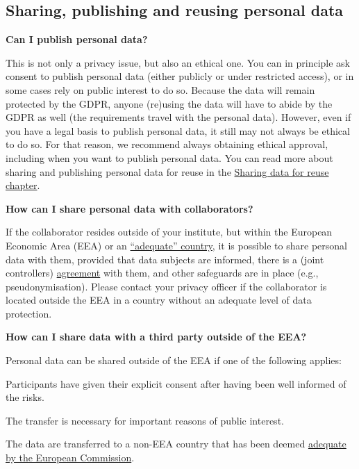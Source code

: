 \documentclass[
]{book}
\begin{document}
\hypertarget{sharing}{%
\subsection{Sharing, publishing and reusing personal data}\label{sharing}}

\textbf{Can I publish personal data?}

This is not only a privacy issue, but also an ethical one. You can in principle ask consent to publish personal data (either publicly or under restricted access), or in some cases rely on public interest to do so. Because the data will remain protected by the GDPR, anyone (re)using the data will have to abide by the GDPR as well (the requirements travel with the personal data). However, even if you have a legal basis to publish personal data, it still may not always be ethical to do so. For that reason, we recommend always obtaining ethical approval, including when you want to publish personal data. You can read more about sharing and publishing personal data for reuse in the \protect\hyperlink{data-sharing-reuse}{Sharing data for reuse chapter}.

\textbf{How can I share personal data with collaborators?}

If the collaborator resides outside of your institute, but within the European Economic Area (EEA) or an \href{https://ec.europa.eu/info/law/law-topic/data-protection/international-dimension-data-protection/adequacy-decisions_en}{``adequate'' country}, it is possible to share personal data with them, provided that data subjects are informed, there is a (joint controllers) \protect\hyperlink{agreements}{agreement} with them, and other safeguards are in place (e.g., pseudonymisation). Please contact your privacy officer if the collaborator is located outside the EEA in a country without an adequate level of data protection.

\textbf{How can I share data with a third party outside of the EEA?}

Personal data can be shared outside of the EEA if one of the following applies:

Participants have given their explicit consent after having been well informed of the risks.

The transfer is necessary for important reasons of public interest.

The data are transferred to a non-EEA country that has been deemed \href{https://ec.europa.eu/info/law/law-topic/data-protection/international-dimension-data-protection/adequacy-decisions_en}{adequate by the European Commission}.
\end{document}
